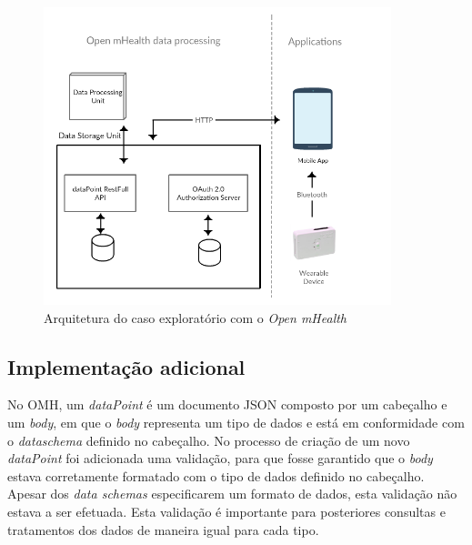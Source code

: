 \begin{figure}[H]
  \centering
  \includegraphics[width=0.9\textwidth]{imgs/omh-arch-exp.png}
  \caption[Arquitetura do caso exploratório com o \textit{Open mHealth}]{Arquitetura do caso exploratório com o \textit{Open mHealth}}
  
  \label{f:exp-omh-arch}
\end{figure}

\subsection{Implementação adicional}
\label{additionalImpl-omh}
No \gls{OMH}, um \textit{dataPoint} é um documento \gls{JSON} composto por um cabeçalho e um \textit{body}, em que o \textit{body} representa um tipo de dados e está em conformidade com o \textit{dataschema} definido no cabeçalho.
No processo de criação de um novo \textit{dataPoint} foi adicionada uma validação, para que fosse garantido que o \textit{body} estava corretamente formatado com o tipo de dados definido no cabeçalho.
Apesar dos \textit{data schemas} especificarem um formato de dados, esta validação não estava a ser efetuada. Esta validação é importante para posteriores consultas e tratamentos dos dados de maneira igual para cada tipo.
\par 


